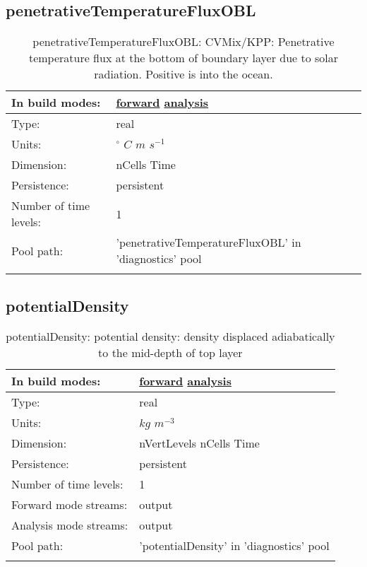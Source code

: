 \subsection[penetrativeTemperatureFluxOBL]{penetrativeTemperatureFluxOBL}
\label{subsec:var_sec_diagnostics_penetrativeTemperatureFluxOBL}
\begin{center}
\begin{longtable}{| p{2.0in} | p{4.0in} |}
        \hline 
        In build modes: & \hyperref[subsec:forward_var_tab_diagnostics]{forward} \hyperref[subsec:analysis_var_tab_diagnostics]{analysis} \\
        \hline 
        Type: & real \\
        \hline 
        Units: & $^\circ$ $C$ $m$ $s^{-1}$ \\
        \hline 
        Dimension: & nCells Time \\
        \hline 
        Persistence: & persistent \\
        \hline 
        Number of time levels: & 1 \\
        \hline 
            Pool path: & 'penetrativeTemperatureFluxOBL' in 'diagnostics' pool
 \\
		 \hline 
    \caption{penetrativeTemperatureFluxOBL: CVMix/KPP: Penetrative temperature flux at the bottom of boundary layer due to solar radiation. Positive is into the ocean.}
\end{longtable}
\end{center}
\subsection[potentialDensity]{potentialDensity}
\label{subsec:var_sec_diagnostics_potentialDensity}
\begin{center}
\begin{longtable}{| p{2.0in} | p{4.0in} |}
        \hline 
        In build modes: & \hyperref[subsec:forward_var_tab_diagnostics]{forward} \hyperref[subsec:analysis_var_tab_diagnostics]{analysis} \\
        \hline 
        Type: & real \\
        \hline 
        Units: & $kg$ $m^{-3}$ \\
        \hline 
        Dimension: & nVertLevels nCells Time \\
        \hline 
        Persistence: & persistent \\
        \hline 
        Number of time levels: & 1 \\
        \hline 
		 Forward mode streams: &  output \\
        \hline 
		 Analysis mode streams: &  output \\
        \hline 
            Pool path: & 'potentialDensity' in 'diagnostics' pool
 \\
		 \hline 
    \caption{potentialDensity: potential density: density displaced adiabatically to the mid-depth of top layer}
\end{longtable}
\end{center}
